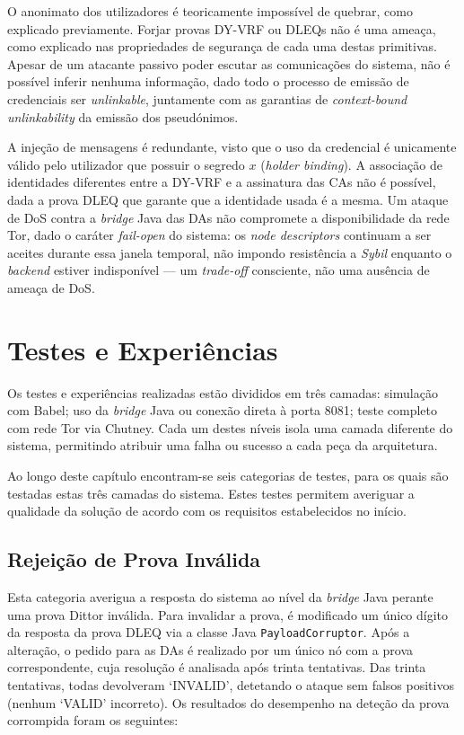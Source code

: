O anonimato dos utilizadores é teoricamente impossível de quebrar, como explicado previamente. Forjar provas DY-VRF ou DLEQs não é uma ameaça, como explicado nas propriedades de segurança de cada uma destas primitivas. Apesar de um atacante passivo poder escutar as comunicações do sistema, não é possível inferir nenhuma informação, dado todo o processo de emissão de credenciais ser \textit{unlinkable}, juntamente com as garantias de \textit{context-bound unlinkability} da emissão dos pseudónimos.

A injeção de mensagens é redundante, visto que o uso da credencial é unicamente válido pelo utilizador que possuir o segredo $x$ (\textit{holder binding}). A associação de identidades diferentes entre a DY-VRF e a assinatura das CAs não é possível, dada a prova DLEQ que garante que a identidade usada é a mesma. Um ataque de DoS contra a \textit{bridge} Java das DAs não compromete a disponibilidade da rede Tor, dado o caráter \textit{fail-open} do sistema: os \textit{node descriptors} continuam a ser aceites durante essa janela temporal, não impondo resistência a \textit{Sybil} enquanto o \textit{backend} estiver indisponível — um \textit{trade-off} consciente, não uma ausência de ameaça de DoS.

\section{Testes e Experiências}
\label{sec:avaliacao_testes}

Os testes e experiências realizadas estão divididos em três camadas: simulação com Babel; uso da \textit{bridge} Java ou conexão direta à porta 8081; teste completo com rede Tor via Chutney. Cada um destes níveis isola uma camada diferente do sistema, permitindo atribuir uma falha ou sucesso a cada peça da arquitetura.

Ao longo deste capítulo encontram-se seis categorias de testes, para os quais são testadas estas três camadas do sistema. Estes testes permitem averiguar a qualidade da solução de acordo com os requisitos estabelecidos no início.

\subsection{Rejeição de Prova Inválida}
\label{sub:teste_rejeicao_prova_invalida}

Esta categoria averigua a resposta do sistema ao nível da \textit{bridge} Java perante uma prova Dittor inválida. Para invalidar a prova, é modificado um único dígito da resposta da prova DLEQ via a classe Java \texttt{PayloadCorruptor}. Após a alteração, o pedido para as DAs é realizado por um único nó com a prova correspondente, cuja resolução é analisada após trinta tentativas. Das trinta tentativas, todas devolveram `INVALID', detetando o ataque sem falsos positivos (nenhum `VALID' incorreto). Os resultados do desempenho na deteção da prova corrompida foram os seguintes:

